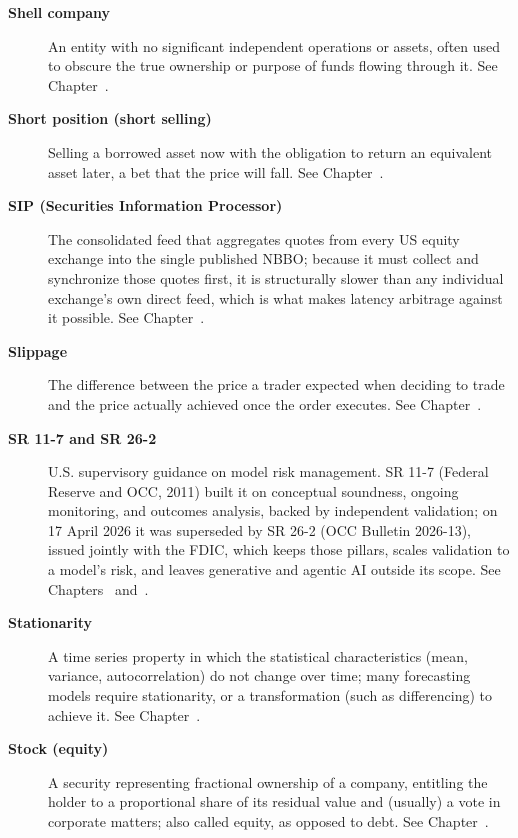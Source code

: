 \documentclass[../ai_in_finance]{subfiles}
\begin{document}
\begin{description}
\item[\textbf{Shell company}] An entity with no significant independent operations or assets, often used to obscure the true ownership or purpose of funds flowing through it. See Chapter~.

\item[\textbf{Short position (short selling)}] Selling a borrowed asset now with the obligation to return an equivalent asset later, a bet that the price will fall. See Chapter~.

\item[\textbf{SIP (Securities Information Processor)}] The consolidated feed that aggregates quotes from every US equity exchange into the single published NBBO; because it must collect and synchronize those quotes first, it is structurally slower than any individual exchange's own direct feed, which is what makes latency arbitrage against it possible. See Chapter~.

\item[\textbf{Slippage}] The difference between the price a trader expected when deciding to trade and the price actually achieved once the order executes. See Chapter~.

\item[\textbf{SR 11-7 and SR 26-2}] U.S. supervisory guidance on model risk management. SR 11-7 (Federal Reserve and OCC, 2011) built it on conceptual soundness, ongoing monitoring, and outcomes analysis, backed by independent validation; on 17 April 2026 it was superseded by SR 26-2 (OCC Bulletin 2026-13), issued jointly with the FDIC, which keeps those pillars, scales validation to a model's risk, and leaves generative and agentic AI outside its scope. See Chapters~ and~.

\item[\textbf{Stationarity}] A time series property in which the statistical characteristics (mean, variance, autocorrelation) do not change over time; many forecasting models require stationarity, or a transformation (such as differencing) to achieve it. See Chapter~.

\item[\textbf{Stock (equity)}] A security representing fractional ownership of a company, entitling the holder to a proportional share of its residual value and (usually) a vote in corporate matters; also called equity, as opposed to debt. See Chapter~.


\end{description}
\end{document}
